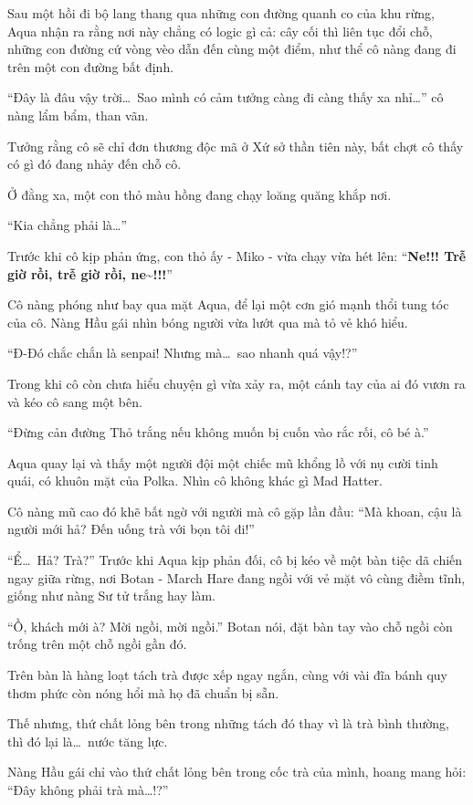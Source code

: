 \documentclass[../main.tex]{subfiles}
\begin{document}
\ct

Sau một hồi đi bộ lang thang qua những con đường quanh co của khu rừng, Aqua nhận ra rằng nơi này chẳng có logic gì cả: cây cối thì liên tục đổi chỗ, những con đường cứ vòng vèo dẫn đến cùng một điểm, như thể cô nàng đang đi trên một con đường bất định.

``Đây là đâu vậy trời\dots\ Sao mình có cảm tưởng càng đi càng thấy xa nhỉ\dots'' cô nàng lẩm bẩm, than vãn.

Tưởng rằng cô sẽ chỉ đơn thương độc mã ở Xứ sở thần tiên này, bất chợt cô thấy có gì đó đang nhảy đến chỗ cô.

Ở đằng xa, một con thỏ màu hồng đang chạy loăng quăng khắp nơi.

``Kia chẳng phải là\dots''

Trước khi cô kịp phản ứng, con thỏ ấy - Miko - vừa chạy vừa hét lên: ``\textbf{Ne!!! Trễ giờ rồi, trễ giờ rồi, ne\~{}!!!}''

Cô nàng phóng như bay qua mặt Aqua, để lại một cơn gió mạnh thổi tung tóc của cô. Nàng Hầu gái nhìn bóng người vừa lướt qua mà tỏ vẻ khó hiểu.

``Đ-Đó chắc chắn là senpai! Nhưng mà\dots\ sao nhanh quá vậy!?''

Trong khi cô còn chưa hiểu chuyện gì vừa xảy ra, một cánh tay của ai đó vươn ra và kéo cô sang một bên.

``Đừng cản đường Thỏ trắng nếu không muốn bị cuốn vào rắc rối, cô bé à.''

Aqua quay lại và thấy một người đội một chiếc mũ khổng lồ với nụ cười tinh quái, có khuôn mặt của Polka. Nhìn cô không khác gì Mad Hatter.

Cô nàng mũ cao đó khẽ bất ngờ với người mà cô gặp lần đầu: ``Mà khoan, cậu là người mới hả? Đến uống trà với bọn tôi đi!''

``Ể\dots\ Hả? Trà?'' Trước khi Aqua kịp phản đối, cô bị kéo về một bàn tiệc dã chiến ngay giữa rừng, nơi Botan - March Hare đang ngồi với vẻ mặt vô cùng điềm tĩnh, giống như nàng Sư tử trắng hay làm.

``Ồ, khách mới à? Mời ngồi, mời ngồi.'' Botan nói, đặt bàn tay vào chỗ ngồi còn trống trên một chỗ ngồi gần đó.

Trên bàn là hàng loạt tách trà được xếp ngay ngắn, cùng với vài đĩa bánh quy thơm phức còn nóng hổi mà họ đã chuẩn bị sẵn.

Thế nhưng, thứ chất lỏng bên trong những tách đó thay vì là trà bình thường, thì đó lại là\dots\ nước tăng lực.

Nàng Hầu gái chỉ vào thứ chất lỏng bên trong cốc trà của mình, hoang mang hỏi: ``Đây không phải trà mà\dots!?''
\end{document}
